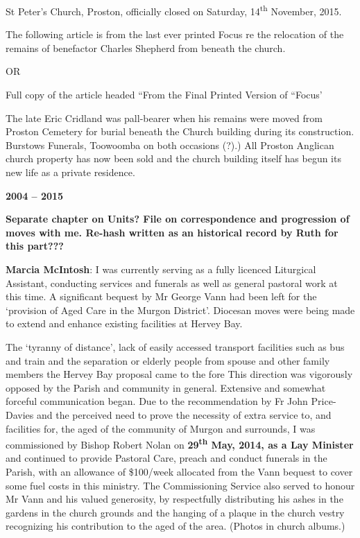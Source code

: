 St Peter's Church, Proston, officially closed on Saturday,
14\textsuperscript{th} November, 2015.

The following article is from the last ever printed Focus re the
relocation of the remains of benefactor Charles Shepherd from beneath
the church.

OR

Full copy of the article headed ``From the Final Printed Version of
``Focus'

The late Eric Cridland was pall-bearer when his remains were moved from
Proston Cemetery for burial beneath the Church building during its
construction. Burstows Funerals, Toowoomba on both occasions (?).) All
Proston Anglican church property has now been sold and the church
building itself has begun its new life as a private residence.

\textbf{2004 -- 2015}

\textbf{Separate chapter on Units? File on correspondence and
progression of moves with me. Re-hash written as an historical record by
Ruth for this part???}

\textbf{Marcia McIntosh}: I was currently serving as a fully licenced
Liturgical Assistant, conducting services and funerals as well as
general pastoral work at this time. A significant bequest by Mr George
Vann had been left for the `provision of Aged Care in the Murgon
District'. Diocesan moves were being made to extend and enhance existing
facilities at Hervey Bay.

The `tyranny of distance', lack of easily accessed transport facilities
such as bus and train and the separation or elderly people from spouse
and other family members the Hervey Bay proposal came to the fore This
direction was vigorously opposed by the Parish and community in general.
Extensive and somewhat forceful communication began. Due to the
recommendation by Fr John Price-Davies and the perceived need to prove
the necessity of extra service to, and facilities for, the aged of the
community of Murgon and surrounds, I was commissioned by Bishop Robert
Nolan on \textbf{29\textsuperscript{th} May, 2014, as a Lay Minister}
and continued to provide Pastoral Care, preach and conduct funerals in
the Parish, with an allowance of \$100/week allocated from the Vann
bequest to cover some fuel costs in this ministry. The Commissioning
Service also served to honour Mr Vann and his valued generosity, by
respectfully distributing his ashes in the gardens in the church grounds
and the hanging of a plaque in the church vestry recognizing his
contribution to the aged of the area. (Photos in church albums.)


